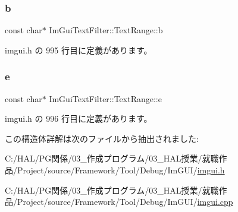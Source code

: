 \subsubsection{\texorpdfstring{b}{b}}
{\footnotesize\ttfamily const char$\ast$ Im\+Gui\+Text\+Filter\+::\+Text\+Range\+::b}



 imgui.\+h の 995 行目に定義があります。

\mbox{\label{struct_im_gui_text_filter_1_1_text_range_a20daef0e47167d49a017d8f54cb7c607}} 
\subsubsection{\texorpdfstring{e}{e}}
{\footnotesize\ttfamily const char$\ast$ Im\+Gui\+Text\+Filter\+::\+Text\+Range\+::e}



 imgui.\+h の 996 行目に定義があります。



この構造体詳解は次のファイルから抽出されました\+:\begin{DoxyCompactItemize}
\item 
C\+:/\+H\+A\+L/\+P\+G関係/03\+\_\+作成プログラム/03\+\_\+\+H\+A\+L授業/就職作品/\+Project/source/\+Framework/\+Tool/\+Debug/\+Im\+G\+U\+I/\mbox{\hyperlink{imgui_8h}{imgui.\+h}}\item 
C\+:/\+H\+A\+L/\+P\+G関係/03\+\_\+作成プログラム/03\+\_\+\+H\+A\+L授業/就職作品/\+Project/source/\+Framework/\+Tool/\+Debug/\+Im\+G\+U\+I/\mbox{\hyperlink{imgui_8cpp}{imgui.\+cpp}}\end{DoxyCompactItemize}
